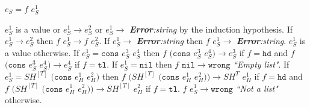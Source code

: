 \begin{case}
$e_{S}=f$ $e_{S}^{1}$

$e_{S}^{1}$ is a value or $e_{S}^{1}\rightarrow e_{S}^{2}$ or $e_{S}^{1}\rightarrow$ \emph{\textbf{Error}:\;string} by the induction hypothesis.  If $e_{S}^{1}\rightarrow e_{S}^{2}$ then $f$ $e_{S}^{1}\rightarrow f$ $e_{S}^{2}$.  If $e_{S}^{1}\rightarrow$ \emph{\textbf{Error}:\;string} then $f$ $e_{S}^{1}\rightarrow$ \emph{\textbf{Error}:\;string}.  $e_{S}^{1}$ is a value otherwise.  If $e_{S}^{1}=\mathtt{cons}$ $e_{S}^{3}$ $e_{S}^{4}$ then $f$ $(\mathtt{cons}$ $e_{S}^{3}$ $e_{S}^{4})\rightarrow e_{S}^{3}$ if $f=\mathtt{hd}$ and $f$ $(\mathtt{cons}$ $e_{S}^{3}$ $e_{S}^{4})\rightarrow e_{S}^{4}$ if $f=\mathtt{tl}$.  If $e_{S}^{1}=\mathtt{nil}$ then $f$ $\mathtt{nil}\rightarrow\mathtt{wrong}$ \emph{``Empty list"}.  If $e_{S}^{1}=SH^{[T]}$ $(\mathtt{cons}$ $e_{H}^{1}$ $e_{H}^{2})$ then $f$ $(SH^{[T]}$ $(\mathtt{cons}$ $e_{H}^{1}$ $e_{H}^{2}))\rightarrow SH^{T}$ $e_{H}^{1}$ if $f=\mathtt{hd}$ and $f$ $(SH^{[T]}$ $(\mathtt{cons}$ $e_{H}^{1}$ $e_{H}^{2}))\rightarrow SH^{[T]}$ $e_{H}^{2}$ if $f=\mathtt{tl}$.  $f$ $e_{S}^{1}\rightarrow\mathtt{wrong}$ \emph{``Not a list"} otherwise.
\end{case}